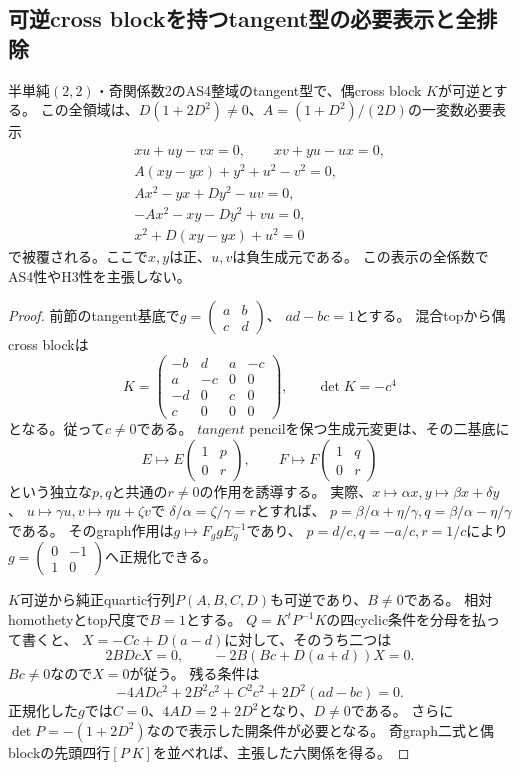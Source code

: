 \subsection{可逆cross blockを持つtangent型の必要表示と全排除}
\label{subsec:h3-order2-22-tangent-normalform}
\begin{proposition}\label{prop:h3-order2-22-tangent-normalform}
半単純$(2,2)$・奇関係数2のAS4整域のtangent型で、偶cross block $K$が可逆とする。
この全領域は、$D(1+2D^2)\ne0$、$A=(1+D^2)/(2D)$の一変数必要表示
\begin{gather*}
 xu+uy-vx=0,\qquad xv+yu-ux=0,\\
 A(xy-yx)+y^2+u^2-v^2=0,\\
 Ax^2-yx+Dy^2-uv=0,\\
 -Ax^2-xy-Dy^2+vu=0,\\
 x^2+D(xy-yx)+u^2=0
\end{gather*}
で被覆される。ここで$x,y$は正、$u,v$は負生成元である。
この表示の全係数でAS4性やH3性を主張しない。
\end{proposition}
\begin{proof}
前節のtangent基底で$g=\left(\begin{smallmatrix}a&b\\c&d\end{smallmatrix}\right)$、
$ad-bc=1$とする。
混合topから偶cross blockは
\[
 K=\begin{pmatrix}-b&d&a&-c\\a&-c&0&0\\-d&0&c&0\\c&0&0&0\end{pmatrix},
 \qquad\det K=-c^4
\]
となる。従って$c\ne0$である。
$tangent$ pencilを保つ生成元変更は、その二基底に
\[
 E\mapsto E\begin{pmatrix}1&p\\0&r\end{pmatrix},\qquad
 F\mapsto F\begin{pmatrix}1&q\\0&r\end{pmatrix}
\]
という独立な$p,q$と共通の$r\ne0$の作用を誘導する。
実際、$x\mapsto\alpha x,y\mapsto\beta x+\delta y$、
$u\mapsto\gamma u,v\mapsto\eta u+\zeta v$で
$\delta/\alpha=\zeta/\gamma=r$とすれば、
$p=\beta/\alpha+\eta/\gamma,q=\beta/\alpha-\eta/\gamma$である。
そのgraph作用は$g\mapsto F_g gE_g^{-1}$であり、
$p=d/c,q=-a/c,r=1/c$により
$g=\left(\begin{smallmatrix}0&-1\\1&0\end{smallmatrix}\right)$へ正規化できる。

$K$可逆から純正quartic行列$P(A,B,C,D)$も可逆であり、$B\ne0$である。
相対homothetyとtop尺度で$B=1$とする。
$Q=K^tP^{-1}K$の四cyclic条件を分母を払って書くと、
$X=-Cc+D(a-d)$に対して、そのうち二つは
\[
 2BDcX=0,\qquad -2B(Bc+D(a+d))X=0.
\]
$Bc\ne0$なので$X=0$が従う。
残る条件は
\[
 -4ADc^2+2B^2c^2+C^2c^2+2D^2(ad-bc)=0.
\]
正規化した$g$では$C=0$、$4AD=2+2D^2$となり、$D\ne0$である。
さらに$\det P=-(1+2D^2)$なので表示した開条件が必要となる。
奇graph二式と偶blockの先頭四行$[P\ K]$を並べれば、主張した六関係を得る。
\end{proof}

